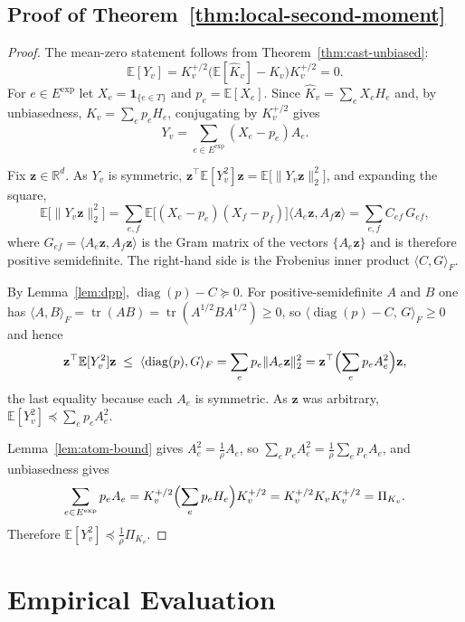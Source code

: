 \documentclass{article}
\newcommand{\1}{\mathbbm{1}}
\theoremstyle{plain}
\begin{document}
\subsection{Proof of Theorem~\ref{thm:local-second-moment}}
\label{app:local-second-moment}
\begin{proof}
The mean-zero statement follows from
Theorem~\ref{thm:cast-unbiased}:
\[
\mathbb{E}[Y_v]
= K_v^{+/2}\bigl(\mathbb{E}[\widehat K_v]-K_v\bigr)K_v^{+/2}=0 .
\]
For $e\in E^{\mathrm{exp}}$ let $X_e=\mathbf 1_{\{e\in T\}}$ and
$p_e=\mathbb{E}[X_e]$. Since
$\widehat K_v=\sum_{e}X_eH_e$ and, by unbiasedness,
$K_v=\sum_{e}p_eH_e$, conjugating by $K_v^{+/2}$ gives
\[
Y_v=\sum_{e\in E^{\mathrm{exp}}}(X_e-p_e)A_e .
\]

Fix $\mathbf z\in\mathbb{R}^d$. As $Y_v$ is symmetric,
$\mathbf z^\top\mathbb{E}[Y_v^2]\mathbf z
=\mathbb{E}\bigl[\lVert Y_v\mathbf z\rVert_2^2\bigr]$, and expanding
the square,
\[
\mathbb{E}\bigl[\lVert Y_v\mathbf z\rVert_2^2\bigr]
=\sum_{e,f}\mathbb{E}\bigl[(X_e-p_e)(X_f-p_f)\bigr]
 \langle A_e\mathbf z,A_f\mathbf z\rangle
=\sum_{e,f}C_{ef}\,G_{ef},
\]
where $G_{ef}=\langle A_e\mathbf z,A_f\mathbf z\rangle$ is the Gram
matrix of the vectors $\{A_e\mathbf z\}$ and is therefore positive
semidefinite. The right-hand side is the Frobenius inner product
$\langle C,G\rangle_F$.

By Lemma~\ref{lem:dpp}, $\operatorname{diag}(p)-C\succeq 0$. For
positive-semidefinite $A$ and $B$ one has
$\langle A,B\rangle_F=\operatorname{tr}(AB)
=\operatorname{tr}(A^{1/2}BA^{1/2})\geq 0$, so
$\langle\operatorname{diag}(p)-C,\,G\rangle_F\geq 0$ and hence
\[
\mathbf z^\top\mathbb{E}[Y_v^2]\mathbf z
\;\leq\;\langle\operatorname{diag}(p),G\rangle_F
=\sum_{e}p_e\lVert A_e\mathbf z\rVert_2^2
=\mathbf z^\top\Bigl(\sum_{e}p_eA_e^2\Bigr)\mathbf z,
\]
the last equality because each $A_e$ is symmetric. As $\mathbf z$ was
arbitrary, $\mathbb{E}[Y_v^2]\preceq\sum_{e}p_eA_e^2$.

Lemma~\ref{lem:atom-bound} gives $A_e^2=\frac{1}{\rho}A_e$, so
$\sum_{e}p_eA_e^2=\frac{1}{\rho}\sum_{e}p_eA_e$, and unbiasedness
gives
\[
\sum_{e\in E^{\mathrm{exp}}}p_eA_e
= K_v^{+/2}\Bigl(\sum_{e}p_eH_e\Bigr)K_v^{+/2}
= K_v^{+/2}K_vK_v^{+/2}
= \Pi_{K_v}.
\]
Therefore $\mathbb{E}[Y_v^2]\preceq\frac{1}{\rho}\Pi_{K_v}$.
\end{proof}




\section{Empirical Evaluation}
\label{app:additional_exp}
\end{document}
